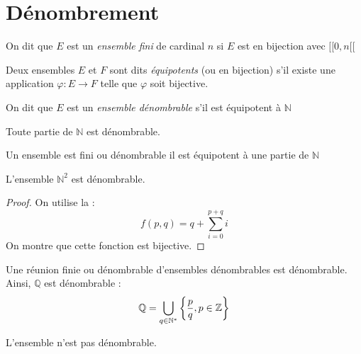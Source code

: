 \documentclass[11pt,a4paper,fleqn,pdftex]{report}
\begin{document}
\section{Dénombrement} %
\label{sec:denombrement}
\begin{dfn}
     On dit que $E$ est un \emph{ensemble fini} de cardinal $n$ si $E$ est en bijection avec $[\![ 0 , n [\![$
\end{dfn}
\begin{dfn}[Equipotence]
     Deux ensembles $E$ et $F$ sont dits \emph{équipotents} (ou en bijection) s'il existe une application $\varphi : E \to F$ telle que $\varphi$ soit bijective.
\end{dfn}
\begin{dfn}
     On dit que $E$ est un \emph{ensemble dénombrable} s'il est équipotent à $\mathbb{N}$
\end{dfn}
\begin{theorem}
     Toute partie  de $\mathbb{N}$ est dénombrable.
\end{theorem}
\begin{theorem}
     Un ensemble est fini ou dénombrable  il est équipotent à une partie de $\mathbb{N}$
\end{theorem}
\begin{itheorem}
     L'ensemble $\mathbb{N}^2$ est dénombrable.
\end{itheorem}
\begin{proof}
     On utilise la  : 
     \begin{equation}
     f(p,q) = q + \sum_{i=0}^{p+q} i
     \end{equation}
     On montre que cette fonction est bijective.
\end{proof}
\begin{theorem}
     Une réunion finie ou dénombrable d'ensembles dénombrables est dénombrable.\\[5mm]
     Ainsi, $\mathbb{Q}$ est dénombrable : \[\mathbb{Q} = \bigcup_{q\in\mathbb{N}^*}\left\lbrace \vphantom{\mathbb{N}} \frac{p}{q}, p \in \mathbb{Z} \right\rbrace\]
\end{theorem}
\begin{theorem}
     L'ensemble \Reel{} n'est pas dénombrable.
\end{theorem}
\end{document}

